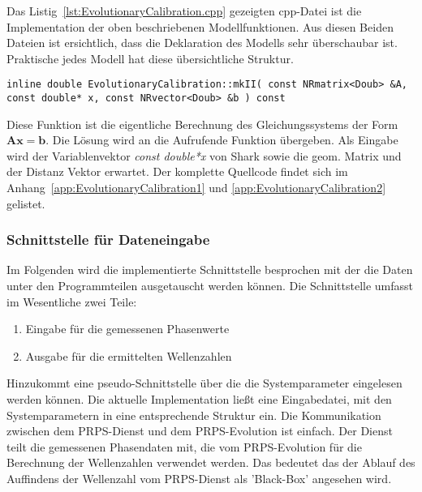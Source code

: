 %
%

\label{lst:EvolutionaryCalibration.h}
%
Das Listig~\ref{lst:EvolutionaryCalibration.cpp} gezeigten cpp-Datei ist die Implementation der oben beschriebenen Modellfunktionen. Aus diesen Beiden Dateien ist ersichtlich, dass die Deklaration des Modells sehr überschaubar ist. Praktische jedes Modell hat diese übersichtliche Struktur. 
%
\begin{lstlisting}[label=EvolutionaryCalibration_4]
inline double EvolutionaryCalibration::mkII( const NRmatrix<Doub> &A, const double* x, const NRvector<Doub> &b ) const
\end{lstlisting}
%
Diese Funktion ist die eigentliche Berechnung des Gleichungssystems der Form $\mathbf{A}\mathbf{x}=\textbf{b}$. Die Lösung wird an die Aufrufende Funktion übergeben. Als Eingabe wird der Variablenvektor \textit{const double*x} von Shark sowie die geom. Matrix und der Distanz Vektor erwartet.
%
Der komplette Quellcode findet sich im Anhang~\ref{app:EvolutionaryCalibration1} und \ref{app:EvolutionaryCalibration2} gelistet.
%
%

				 \label{lst:EvolutionaryCalibration.cpp}
%
\label{lst:shark_model}
%
\subsubsection{Schnittstelle für Dateneingabe}
%
Im Folgenden wird die implementierte Schnittstelle besprochen mit der die Daten unter den Programmteilen ausgetauscht werden können. Die Schnittstelle umfasst im Wesentliche zwei Teile:
\begin{enumerate}
	\item Eingabe für die gemessenen Phasenwerte
	\item Ausgabe für die ermittelten Wellenzahlen
\end{enumerate}
%
Hinzukommt eine pseudo-Schnittstelle über die die Systemparameter eingelesen werden können. Die aktuelle Implementation ließt eine Eingabedatei, mit den Systemparametern in eine entsprechende Struktur ein.
%
Die Kommunikation zwischen dem PRPS-Dienst und dem PRPS-Evolution ist einfach. Der Dienst teilt die gemessenen Phasendaten mit, die vom PRPS-Evolution für die Berechnung der Wellenzahlen verwendet werden. Das bedeutet das der Ablauf des Auffindens der Wellenzahl vom PRPS-Dienst als 'Black-Box' angesehen wird.\\
%
%
